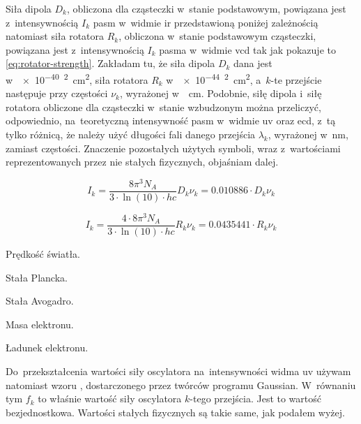 Siła dipola $D_k$, obliczona dla cząsteczki w~stanie podstawowym, powiązana jest
  z~intensywnością $I_k$ pasm w~widmie \gls{ir} przedstawioną poniżej zależnością
   natomiast siła rotatora $R_k$, obliczona w~stanie podstawowym
  cząsteczki, powiązana jest z~intensywnością $I_k$ pasma w~widmie \gls{vcd} tak jak
  pokazuje to \cref{eq:rotator-strength}.
Zakładam tu, że siła dipola $D_k$ dana jest w~\SI{e-40}{\esu\squared\centi\meter\squared},
  siła rotatora $R_k$ w~\SI{e-44}{\esu\squared\centi\meter\squared}, a~$k$-te przejście
  następuje przy częstości $\nu_k$, wyrażonej w~\si{\per\centi\meter}.
Podobnie, siłę dipola i~siłę rotatora obliczone dla cząsteczki w~stanie wzbudzonym można
  przeliczyć, odpowiednio, na~teoretyczną intensywność pasm w~widmie \gls{uv} oraz \gls{ecd},
  z~tą tylko różnicą, że należy użyć długości fali danego przejścia $\lambda_k$, wyrażonej
  w~\si{\nano\meter}, zamiast częstości.
Znaczenie pozostałych użytych symboli, wraz z~wartościami reprezentowanych przez nie
  stałych fizycznych, objaśniam dalej.

\begin{equation}\label{eq:dipole-strength}
  I_k = \frac{8 \pi^3 N_{\!A}}{3 \cdot \ln(10) \cdot hc} D_k \nu_k
      = 0.010886 \cdot D_k \nu_k
\end{equation}

\begin{equation}\label{eq:rotator-strength}
  I_k = \frac{4 \cdot 8 \pi^3 N_{\!A}}{3 \cdot \ln(10) \cdot hc} R_k \nu_k
      = 0.0435441 \cdot R_k \nu_k
\end{equation}

\begin{description}[noitemsep]
  \item[$c = \SI{2.99792458e10}{\centi\meter\per\second}$] \hfill Prędkość światła.
  \item[$h = \SI{6.62606896e-30}{\kilo\gram\centi\meter\squared\per\second}$] \hfill Stała Plancka.
  \item[$N_A = \SI{6.02214199e23}{\per\mole}$] \hfill Stała Avogadro.
  \item[$m_e = \SI{9.10938e-28}{\gram}$] \hfill Masa elektronu.
  \item[$e = \SI{4.803204e-10}{\esu}$] \hfill Ładunek elektronu.
\end{description}

Do~przekształcenia wartości siły oscylatora na~intensywności widma \gls{uv} używam natomiast
  wzoru , dostarczonego przez twórców programu
  Gaussian.
W~równaniu tym $f_k$ to właśnie wartość siły oscylatora $k$-tego przejścia.
Jest to wartość bezjednostkowa.
Wartości stałych fizycznych są takie same, jak podałem wyżej.

